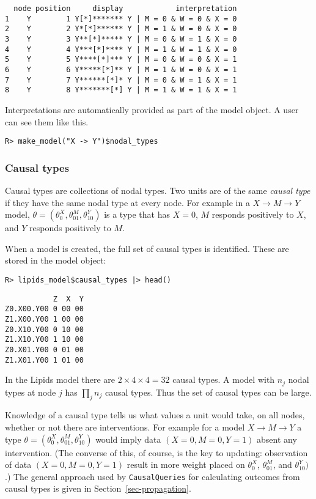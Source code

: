 \documentclass[
  11pt,
  article]{jss}
\begin{document}
\begin{verbatim}
  node position     display            interpretation
1    Y        1 Y[*]******* Y | M = 0 & W = 0 & X = 0
2    Y        2 Y*[*]****** Y | M = 1 & W = 0 & X = 0
3    Y        3 Y**[*]***** Y | M = 0 & W = 1 & X = 0
4    Y        4 Y***[*]**** Y | M = 1 & W = 1 & X = 0
5    Y        5 Y****[*]*** Y | M = 0 & W = 0 & X = 1
6    Y        6 Y*****[*]** Y | M = 1 & W = 0 & X = 1
7    Y        7 Y******[*]* Y | M = 0 & W = 1 & X = 1
8    Y        8 Y*******[*] Y | M = 1 & W = 1 & X = 1
\end{verbatim}

Interpretations are automatically provided as part of the model object.
A user can see them like this.

\begin{verbatim}
R> make_model("X -> Y")$nodal_types
\end{verbatim}

\hypertarget{sec-causal-types}{%
\subsubsection{Causal types}\label{sec-causal-types}}

Causal types are collections of nodal types. Two units are of the same
\emph{causal type} if they have the same nodal type at every node. For
example in a \(X \rightarrow M \rightarrow Y\) model,
\(\theta = (\theta^X_0, \theta^M_{01}, \theta^Y_{10})\) is a type that
has \(X=0\), \(M\) responds positively to \(X\), and \(Y\) responds
positively to \(M\).

When a model is created, the full set of causal types is identified.
These are stored in the model object:

\begin{verbatim}
R> lipids_model$causal_types |> head()
\end{verbatim}

\begin{verbatim}
           Z  X  Y
Z0.X00.Y00 0 00 00
Z1.X00.Y00 1 00 00
Z0.X10.Y00 0 10 00
Z1.X10.Y00 1 10 00
Z0.X01.Y00 0 01 00
Z1.X01.Y00 1 01 00
\end{verbatim}

In the Lipids model there are \(2\times 4\times 4 = 32\) causal types. A
model with \(n_j\) nodal types at node \(j\) has \(\prod_jn_j\) causal
types. Thus the set of causal types can be large.

Knowledge of a causal type tells us what values a unit would take, on
all nodes, whether or not there are interventions. For example for a
model \(X \rightarrow M \rightarrow Y\) a type
\(\theta = (\theta^X_0, \theta^M_{01}, \theta^Y_{10})\) would imply data
\((X=0, M=0, Y=1)\) absent any intervention. (The converse of this, of
course, is the key to updating: observation of data \((X=0, M=0, Y=1)\)
result in more weight placed on \(\theta^X_0\), \(\theta^M_{01}\), and
\(\theta^Y_{10})\).) The general approach used by \texttt{CausalQueries}
for calculating outcomes from causal types is given in
Section~\ref{sec-propagation}.
\end{document}
